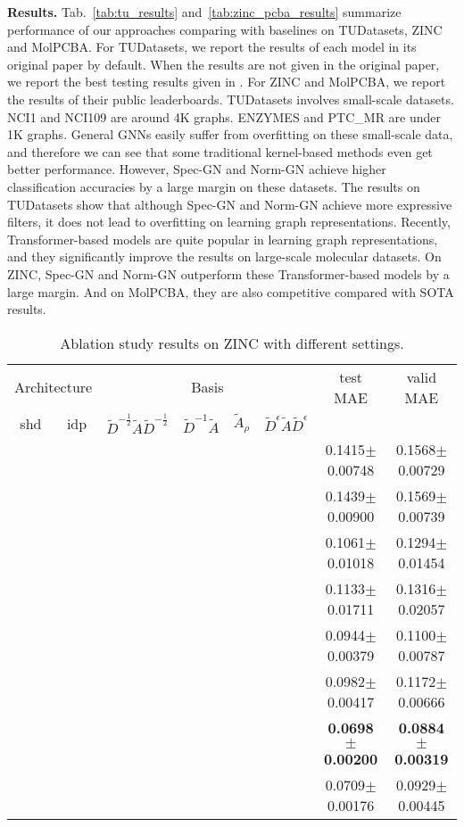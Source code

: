 \documentclass[nohyperref]{article}
\newcommand{\yes}{\ding{51}}
\theoremstyle{plain}
\theoremstyle{definition}
\theoremstyle{remark}
\begin{document}
\textbf{Results.}
Tab.~\ref{tab:tu_results} and~\ref{tab:zinc_pcba_results} summarize performance of our approaches comparing with baselines on TUDatasets, ZINC and MolPCBA.
For TUDatasets, we report the results of each model in its original paper by default. When the results are not given in the original paper, we report the best testing results given in \cite{zhang2018end,pmlr-v80-ivanov18a,xinyi2018capsule}.
For ZINC and MolPCBA, we report the results of their public leaderboards.
TUDatasets involves small-scale datasets.
NCI1 and NCI109 are around 4K graphs.
ENZYMES and PTC\_MR are under 1K graphs.
General GNNs easily suffer from overfitting on these small-scale data, and therefore we can see that some traditional kernel-based methods even get better performance.
However, Spec-GN and Norm-GN achieve higher classification accuracies by a large margin on these datasets.
The results on TUDatasets show that although Spec-GN and Norm-GN achieve more expressive filters, it does not lead to overfitting on learning graph representations.
Recently, Transformer-based models are quite popular in learning graph representations, and they significantly improve the results on large-scale molecular datasets.
On ZINC, Spec-GN and Norm-GN outperform these Transformer-based models by a large margin.
And on MolPCBA, they are also competitive compared with SOTA results.

\begin{table*}[th]
	\small
	\centering
	\caption{Ablation study results on ZINC with different settings. }
	\label{tab:ablation}
	\vspace{5pt}
	\begin{tabular}{cccccccc}
		\toprule
		\multicolumn{2}{c}{Architecture} & \multicolumn{4}{c}{Basis}  & \multirow{1}{*}{test MAE} & \multirow{1}{*}{valid MAE}\\ \cline{1-2} \cline{3-6}
		shd&idp&$\tilde{D}^{-\frac{1}{2}}\tilde{A}\tilde{D}^{-\frac{1}{2}}$&$\tilde D^{-1}\tilde A$&$\tilde A_{\rho}$&$\tilde{D}^{\epsilon}\tilde{A}\tilde{D}^{\epsilon}$& &\\ \hline
		\yes& &\yes& & & & 0.1415$\pm$0.00748 & 0.1568$\pm$0.00729 \\ \hline
		\yes& & &\yes& & & 0.1439$\pm$0.00900 & 0.1569$\pm$0.00739 \\ \hline
		\yes& & & &\yes& & 0.1061$\pm$0.01018 & 0.1294$\pm$0.01454 \\ \hline
		\yes& & & & &\yes& 0.1133$\pm$0.01711 & 0.1316$\pm$0.02057 \\ \hline
		&\yes&\yes& & & & 0.0944$\pm$0.00379 & 0.1100$\pm$0.00787 \\ \hline
		&\yes& &\yes& & & 0.0982$\pm$0.00417 & 0.1172$\pm$0.00666 \\ \hline
		&\yes& & &\yes& & \textbf{0.0698}$\pm$\textbf{0.00200} & \textbf{0.0884}$\pm$\textbf{0.00319} \\ \hline
		&\yes& & & &\yes & 0.0709$\pm$0.00176 & 0.0929$\pm$0.00445 \\
		\bottomrule
	\end{tabular}
	\vspace{-10pt}
\end{table*}
\end{document}
